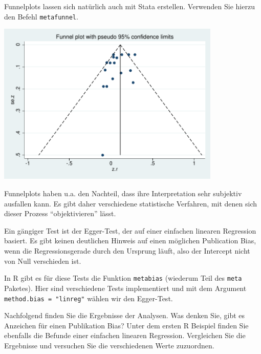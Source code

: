 \documentclass[normalheadings, 10pt]{scrartcl}\usepackage{graphicx, color}
\newcommand{\code}[1]{\texttt{#1}}
\begin{document}
Funnelplots lassen sich natürlich auch mit Stata erstellen. Verwenden Sie hierzu den Befehl \code{metafunnel}.

\begin{statabsp}
  
\end{statabsp}

\begin{center}
  \includegraphics[width=0.8\textwidth]{f_stata_funnelplot}
\end{center}

Funnelplots haben u.a. den Nachteil, dass ihre Interpretation sehr subjektiv
ausfallen kann. Es gibt daher verschiedene statistische Verfahren, mit denen
sich dieser Prozess \enquote{objektivieren} lässt.

Ein gängiger Test ist der Egger-Test, der auf einer einfachen linearen Regression
basiert. Es gibt keinen deutlichen Hinweis auf einen möglichen Publication Bias,
wenn die Regressionsgerade durch den Ursprung läuft, also der Intercept nicht
von Null verschieden ist.

In R gibt es für diese Tests die Funktion \code{metabias} (wiederum Teil des
\code{meta} Paketes). Hier sind verschiedene Tests implementiert und mit dem
Argument \code{ method.bias = "linreg"} wählen wir den Egger-Test.

\pagebreak

Nachfolgend finden Sie die Ergebnisse der Analysen. Was denken Sie, gibt es
Anzeichen für einen Publikation Bias? Unter dem ersten R Beispiel finden Sie
ebenfalls die Befunde einer einfachen linearen Regression. Vergleichen Sie die
Ergebnisse und versuchen Sie die verschiedenen Werte zuzuordnen.
\end{document}
